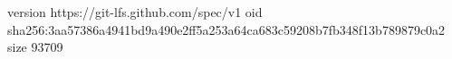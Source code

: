 version https://git-lfs.github.com/spec/v1
oid sha256:3aa57386a4941bd9a490e2ff5a253a64ca683c59208b7fb348f13b789879c0a2
size 93709
